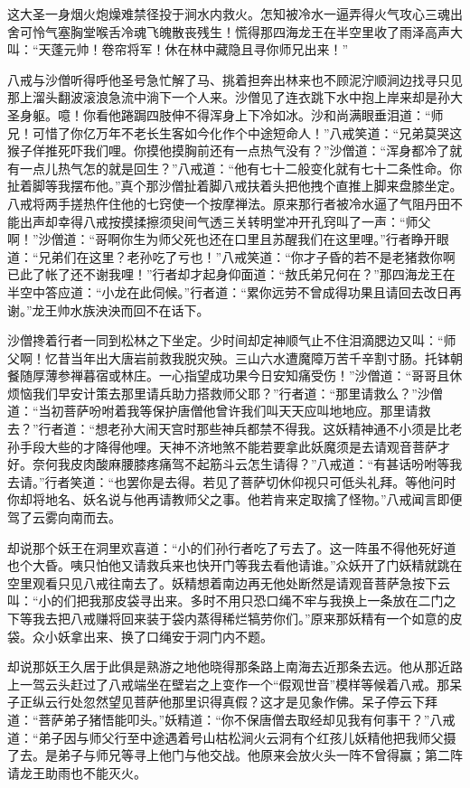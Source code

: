 \documentclass[12pt,UTF8]{ctexbook}
\begin{document}
这大圣一身烟火炮燥难禁径投于涧水内救火。怎知被冷水一逼弄得火气攻心三魂出舍可怜气塞胸堂喉舌冷魂飞魄散丧残生！慌得那四海龙王在半空里收了雨泽高声大叫：“天蓬元帅！卷帘将军！休在林中藏隐且寻你师兄出来！”

八戒与沙僧听得呼他圣号急忙解了马、挑着担奔出林来也不顾泥泞顺涧边找寻只见那上溜头翻波滚浪急流中淌下一个人来。沙僧见了连衣跳下水中抱上岸来却是孙大圣身躯。噫！你看他踡跼四肢伸不得浑身上下冷如冰。沙和尚满眼垂泪道：“师兄！可惜了你亿万年不老长生客如今化作个中途短命人！”八戒笑道：“兄弟莫哭这猴子佯推死吓我们哩。你摸他摸胸前还有一点热气没有？”沙僧道：“浑身都冷了就有一点儿热气怎的就是回生？”八戒道：“他有七十二般变化就有七十二条性命。你扯着脚等我摆布他。”真个那沙僧扯着脚八戒扶着头把他拽个直推上脚来盘膝坐定。八戒将两手搓热仵住他的七窍使一个按摩禅法。原来那行者被冷水逼了气阻丹田不能出声却幸得八戒按摸揉擦须臾间气透三关转明堂冲开孔窍叫了一声：“师父啊！”沙僧道：“哥啊你生为师父死也还在口里且苏醒我们在这里哩。”行者睁开眼道：“兄弟们在这里？老孙吃了亏也！”八戒笑道：“你才子昏的若不是老猪救你啊已此了帐了还不谢我哩！”行者却才起身仰面道：“敖氏弟兄何在？”那四海龙王在半空中答应道：“小龙在此伺候。”行者道：“累你远劳不曾成得功果且请回去改日再谢。”龙王帅水族泱泱而回不在话下。

沙僧搀着行者一同到松林之下坐定。少时间却定神顺气止不住泪滴腮边又叫：“师父啊！忆昔当年出大唐岩前救我脱灾殃。三山六水遭魔障万苦千辛割寸肠。托钵朝餐随厚薄参禅暮宿或林庄。一心指望成功果今日安知痛受伤！”沙僧道：“哥哥且休烦恼我们早安计策去那里请兵助力搭救师父耶？”行者道：“那里请救么？”沙僧道：“当初菩萨吩咐着我等保护唐僧他曾许我们叫天天应叫地地应。那里请救去？”行者道：“想老孙大闹天宫时那些神兵都禁不得我。这妖精神通不小须是比老孙手段大些的才降得他哩。天神不济地煞不能若要拿此妖魔须是去请观音菩萨才好。奈何我皮肉酸麻腰膝疼痛驾不起筋斗云怎生请得？”八戒道：“有甚话吩咐等我去请。”行者笑道：“也罢你是去得。若见了菩萨切休仰视只可低头礼拜。等他问时你却将地名、妖名说与他再请教师父之事。他若肯来定取擒了怪物。”八戒闻言即便驾了云雾向南而去。

却说那个妖王在洞里欢喜道：“小的们孙行者吃了亏去了。这一阵虽不得他死好道也个大昏。咦只怕他又请救兵来也快开门等我去看他请谁。”众妖开了门妖精就跳在空里观看只见八戒往南去了。妖精想着南边再无他处断然是请观音菩萨急按下云叫：“小的们把我那皮袋寻出来。多时不用只恐口绳不牢与我换上一条放在二门之下等我去把八戒赚将回来装于袋内蒸得稀烂犒劳你们。”原来那妖精有一个如意的皮袋。众小妖拿出来、换了口绳安于洞门内不题。

却说那妖王久居于此俱是熟游之地他晓得那条路上南海去近那条去远。他从那近路上一驾云头赶过了八戒端坐在壁岩之上变作一个“假观世音”模样等候着八戒。那呆子正纵云行处忽然望见菩萨他那里识得真假？这才是见象作佛。呆子停云下拜道：“菩萨弟子猪悟能叩头。”妖精道：“你不保唐僧去取经却见我有何事干？”八戒道：“弟子因与师父行至中途遇着号山枯松涧火云洞有个红孩儿妖精他把我师父摄了去。是弟子与师兄等寻上他门与他交战。他原来会放火头一阵不曾得赢；第二阵请龙王助雨也不能灭火。
\end{document}
